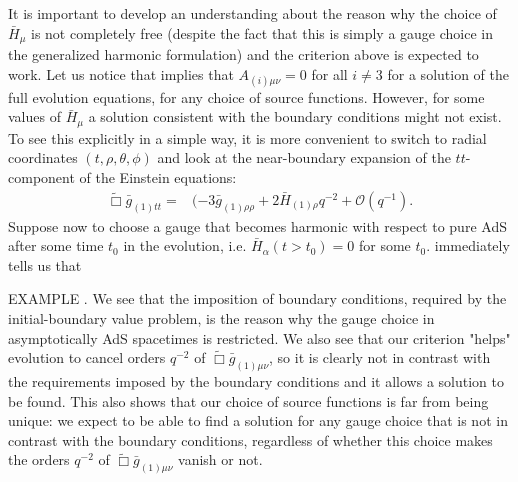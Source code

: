 \documentclass[12pt]{iopart} %
\begin{document}
It is important to develop an understanding about the reason why the choice of $\bar{H}_\mu$ is not completely free (despite the fact that this is simply a gauge choice in the generalized harmonic formulation) and the criterion above is expected to work. 
Let us notice that  implies that $A_{(i)\mu\nu}=0$ for all $i\neq3$ for a solution of the full evolution equations, for any choice of source functions.
%
However, for some values of $\bar{H}_\mu$ a solution consistent with the boundary conditions might not exist. To see this explicitly in a simple way, it is more convenient to switch to radial coordinates $(t,\rho,\theta,\phi)$ and look at the near-boundary expansion of the $tt$-component of the Einstein equations:
\begin{eqnarray}\label{eqn:efettsph}
\tilde{\Box}\bar{g}_{(1)tt}=&(-3 \bar{g}_{(1)\rho\rho}+2\bar{H}_{(1)\rho}q^{-2}+\mathcal{O}(q^{-1}).
\end{eqnarray}
Suppose now to choose a gauge that becomes harmonic with respect to pure AdS after some time $t_0$ in the evolution, i.e. $\bar{H}_{\alpha}(t>t_0)=0$ for some $t_0$.  immediately tells us that 

EXAMPLE . We see that the imposition of boundary conditions, required by the initial-boundary value problem, is the reason why the gauge choice in asymptotically AdS spacetimes is restricted. We also see that our criterion "helps" evolution to cancel orders $q^{-2}$ of $\tilde{\Box}\bar{g}_{(1)\mu\nu}$, so it is clearly not in contrast with the requirements imposed by the boundary conditions and it allows a solution to be found. This also shows that our choice of source functions is far from being unique: we expect to be able to find a solution for any gauge choice that is not in contrast with the boundary conditions, regardless of whether this choice makes the orders $q^{-2}$ of $\tilde{\Box}\bar{g}_{(1)\mu\nu}$ vanish or not.
\end{document}
